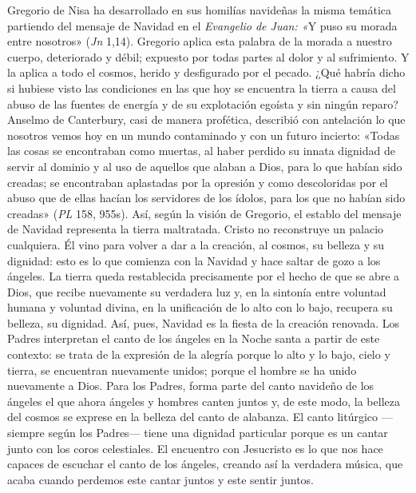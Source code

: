 Gregorio de Nisa ha desarrollado en sus homilías navideñas la misma
temática partiendo del mensaje de Navidad en el \emph{Evangelio de Juan:
	«}Y puso su morada entre nosotros» (\emph{Jn} 1,14). Gregorio aplica
esta palabra de la morada a nuestro cuerpo, deteriorado y débil;
expuesto por todas partes al dolor y al sufrimiento. Y la aplica a todo
el cosmos, herido y desfigurado por el pecado. ¿Qué habría dicho si
hubiese visto las condiciones en las que hoy se encuentra la tierra a
causa del abuso de las fuentes de energía y de su explotación egoísta y
sin ningún reparo? Anselmo de Canterbury, casi de manera profética,
describió con antelación lo que nosotros vemos hoy en un mundo
contaminado y con un futuro incierto: «Todas las cosas se encontraban
como muertas, al haber perdido su innata dignidad de servir al dominio y
al uso de aquellos que alaban a Dios, para lo que habían sido creadas;
se encontraban aplastadas por la opresión y como descoloridas por el
abuso que de ellas hacían los servidores de los ídolos, para los que no
habían sido creadas» (\emph{PL} 158, 955s). Así, según la visión de
Gregorio, el establo del mensaje de Navidad representa la tierra
maltratada. Cristo no reconstruye un palacio cualquiera. Él vino para
volver a dar a la creación, al cosmos, su belleza y su dignidad: esto es
lo que comienza con la Navidad y hace saltar de gozo a los ángeles. La
tierra queda restablecida precisamente por el hecho de que se abre a
Dios, que recibe nuevamente su verdadera luz y, en la sintonía entre
voluntad humana y voluntad divina, en la unificación de lo alto con lo
bajo, recupera su belleza, su dignidad. Así, pues, Navidad es la fiesta
de la creación renovada. Los Padres interpretan el canto de los ángeles
en la Noche santa a partir de este contexto: se trata de la expresión de
la alegría porque lo alto y lo bajo, cielo y tierra, se encuentran
nuevamente unidos; porque el hombre se ha unido nuevamente a Dios. Para
los Padres, forma parte del canto navideño de los ángeles el que ahora
ángeles y hombres canten juntos y, de este modo, la belleza del cosmos
se exprese en la belleza del canto de alabanza. El canto litúrgico
---siempre según los Padres--- tiene una dignidad particular porque es
un cantar junto con los coros celestiales. El encuentro con Jesucristo
es lo que nos hace capaces de escuchar el canto de los ángeles, creando
así la verdadera música, que acaba cuando perdemos este cantar juntos y
este sentir juntos.

